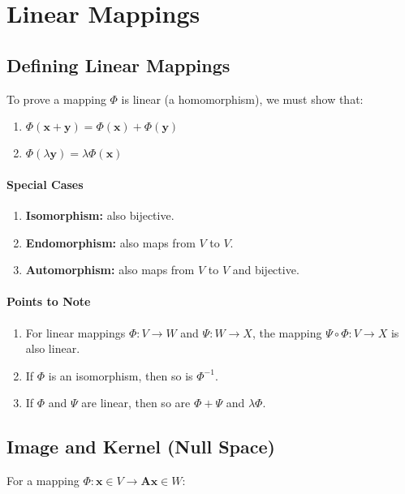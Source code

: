 \documentclass[10pt,twoside,twocolumn]{article}
\begin{document}
\section{Linear Mappings}


\subsection{Defining Linear Mappings}

To prove a mapping $\Phi$ is linear (a homomorphism), we must show
that: 
\begin{enumerate}
\item $\Phi\left(\mathbf{x}+\mathbf{y}\right)=\Phi\left(\mathbf{x}\right)+\Phi\left(\mathbf{y}\right)$ 
\item $\Phi\left(\lambda\mathbf{y}\right)=\lambda\Phi\left(\mathbf{x}\right)$ 
\end{enumerate}

\paragraph{Special Cases}
\begin{enumerate}
\item \textbf{Isomorphism:} also bijective.
\item \textbf{Endomorphism:} also maps from $V$ to $V$.
\item \textbf{Automorphism:} also maps from $V$ to $V$ and bijective.
\end{enumerate}

\paragraph{Points to Note}
\begin{enumerate}
\item For linear mappings $\Phi:V\rightarrow W$ and $\Psi:W\rightarrow X$,
the mapping $\Psi\circ\Phi:V\rightarrow X$ is also linear. 
\item If $\Phi$ is an isomorphism, then so is $\Phi^{-1}$. 
\item If $\Phi$ and $\Psi$ are linear, then so are $\Phi+\Psi$ and $\lambda\Phi$. 
\end{enumerate}

\subsection{Image and Kernel (Null Space)}

For a mapping $\Phi:\mathbf{x}\in V\rightarrow\mathbf{A}\mathbf{x}\in W$:
\end{document}
